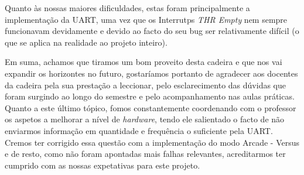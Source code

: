\documentclass{report}
\begin{document}
Quanto às nossas maiores dificuldades, estas foram principalmente a implementação da UART, uma vez que os Interrutps \textit{THR Empty} nem sempre funcionavam devidamente e devido ao facto do seu bug ser relativamente difícil (o que se aplica na realidade ao projeto inteiro).

Em suma, achamos que tiramos um bom proveito desta cadeira e que nos vai expandir os horizontes no futuro, gostaríamos portanto de agradecer aos docentes da cadeira pela sua prestação a leccionar, pelo esclarecimento das dúvidas que foram surgindo ao longo do semestre e pelo acompanhamento nas aulas práticas. Quanto a este último tópico, fomos constantemente coordenando com o professor os aspetos a melhorar a nível de \textit{hardware}, tendo ele salientado o facto de não enviarmos informação em quantidade e frequência o suficiente pela UART. Cremos ter corrigido essa questão com a implementação do modo Arcade - Versus e de resto, como não foram apontadas mais falhas relevantes, acreditarmos ter cumprido com as nossas expetativas para este projeto.

\paragraph{}
\end{document}

